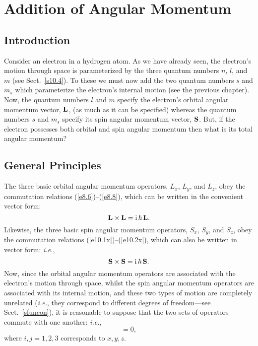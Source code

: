 \chapter{Addition of Angular Momentum}\label{sadd} 
\section{Introduction}
Consider an electron in a hydrogen atom. As we have already seen,  the electron's motion through space is parameterized by the three quantum numbers $n$, $l$,
and $m$ (see Sect.~\ref{s10.4}). To these we must now add the
two quantum numbers $s$ and $m_s$ which parameterize the electron's internal
motion (see the previous chapter). Now, the quantum numbers $l$ and $m$
specify the electron's orbital angular momentum vector, ${\bf L}$, (as much as it can be specified) whereas
the quantum numbers $s$ and $m_s$ specify its spin angular momentum vector,
${\bf S}$. But, if the electron possesses both orbital 
and spin angular momentum  then what is its total angular momentum?

\section{General Principles}\label{s11.2}
The three basic orbital angular momentum operators, $L_x$, $L_y$,
and $L_z$, obey the commutation relations (\ref{e8.6})--(\ref{e8.8}),
which can be written in the convenient vector form:
\begin{equation}
{\bf L}\times{\bf L} = {\rm i}\,\hbar\,{\bf L}.
\end{equation}
Likewise, the three basic spin angular momentum operators, $S_x$, $S_y$,
and $S_z$, obey the commutation relations (\ref{e10.1x})--(\ref{e10.2x}),
which can also be written in  vector form: {\em i.e.},
\begin{equation}
{\bf S}\times{\bf S} = {\rm i}\,\hbar\,{\bf S}.
\end{equation}
Now, since the orbital angular momentum operators are associated
with the electron's motion through space, whilst the spin angular
momentum operators are associated with its internal
motion, and these two types of motion are completely unrelated ({\em i.e.}, they correspond to different degrees of freedom---see Sect.~\ref{sfuncon}), it is reasonable to suppose that the two sets of operators commute with
one another: {\em i.e.},
\begin{equation}
[L_i, S_j] = 0,
\end{equation}
where $i,j=1,2,3$ corresponds to $x,y,z$. 

